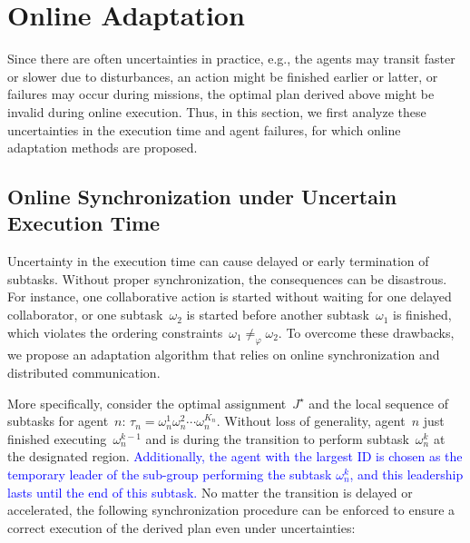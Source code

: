 \section{Online Adaptation}
\label{subsec:online-adaptation}

Since there are often uncertainties in practice, e.g., the agents may
transit faster or slower due to disturbances,
an action might be finished earlier or latter,
or failures may occur during missions,
the optimal plan derived above might be invalid during online execution.
Thus, in this section, we first analyze these uncertainties in the execution time
and agent failures, for which online adaptation methods are proposed.

\subsection{Online Synchronization under Uncertain Execution Time}\label{subsubsec:uncertain}
Uncertainty in the execution time can cause delayed or early termination of subtasks.
Without proper synchronization, the consequences can be disastrous.
For instance, one collaborative action is started without waiting for one
delayed collaborator, or one subtask~$\omega_2$ is started before another
subtask~$\omega_1$ is finished, which violates the ordering constraints~$\omega_1\neq_{\varphi} \omega_2$.
To overcome these drawbacks, we propose an adaptation algorithm
that relies on {online synchronization} and distributed communication.

More specifically, consider the optimal assignment~$J^\star$ and the local
sequence of subtasks for agent~$n$: $\tau_n=\omega^1_n\omega^2_n\cdots \omega^{K_n}_n$.
Without loss of generality, agent~$n$ just finished executing~$\omega^{k-1}_n$ and
is during the transition to perform subtask~$\omega^k_n$ at the designated region.
\textcolor{blue}{Additionally, the agent with the largest ID is chosen as the
  temporary leader of the sub-group performing the subtask $\omega^k_n$,
  and this leadership lasts until the end of this subtask.}
No matter the transition is delayed or accelerated,
the following synchronization procedure can be enforced to
ensure a correct execution of the derived plan even under uncertainties:

